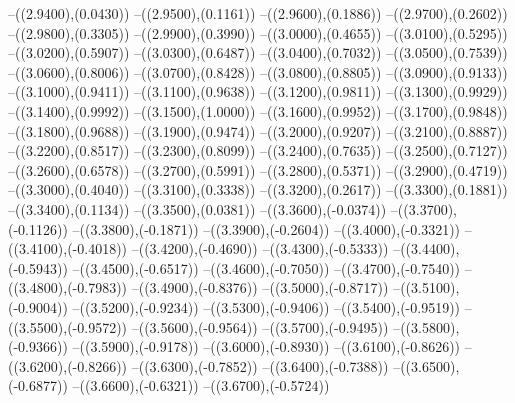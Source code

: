 {	--({\sx*(2.9400)},{\sy*(0.0430)})
	--({\sx*(2.9500)},{\sy*(0.1161)})
	--({\sx*(2.9600)},{\sy*(0.1886)})
	--({\sx*(2.9700)},{\sy*(0.2602)})
	--({\sx*(2.9800)},{\sy*(0.3305)})
	--({\sx*(2.9900)},{\sy*(0.3990)})
	--({\sx*(3.0000)},{\sy*(0.4655)})
	--({\sx*(3.0100)},{\sy*(0.5295)})
	--({\sx*(3.0200)},{\sy*(0.5907)})
	--({\sx*(3.0300)},{\sy*(0.6487)})
	--({\sx*(3.0400)},{\sy*(0.7032)})
	--({\sx*(3.0500)},{\sy*(0.7539)})
	--({\sx*(3.0600)},{\sy*(0.8006)})
	--({\sx*(3.0700)},{\sy*(0.8428)})
	--({\sx*(3.0800)},{\sy*(0.8805)})
	--({\sx*(3.0900)},{\sy*(0.9133)})
	--({\sx*(3.1000)},{\sy*(0.9411)})
	--({\sx*(3.1100)},{\sy*(0.9638)})
	--({\sx*(3.1200)},{\sy*(0.9811)})
	--({\sx*(3.1300)},{\sy*(0.9929)})
	--({\sx*(3.1400)},{\sy*(0.9992)})
	--({\sx*(3.1500)},{\sy*(1.0000)})
	--({\sx*(3.1600)},{\sy*(0.9952)})
	--({\sx*(3.1700)},{\sy*(0.9848)})
	--({\sx*(3.1800)},{\sy*(0.9688)})
	--({\sx*(3.1900)},{\sy*(0.9474)})
	--({\sx*(3.2000)},{\sy*(0.9207)})
	--({\sx*(3.2100)},{\sy*(0.8887)})
	--({\sx*(3.2200)},{\sy*(0.8517)})
	--({\sx*(3.2300)},{\sy*(0.8099)})
	--({\sx*(3.2400)},{\sy*(0.7635)})
	--({\sx*(3.2500)},{\sy*(0.7127)})
	--({\sx*(3.2600)},{\sy*(0.6578)})
	--({\sx*(3.2700)},{\sy*(0.5991)})
	--({\sx*(3.2800)},{\sy*(0.5371)})
	--({\sx*(3.2900)},{\sy*(0.4719)})
	--({\sx*(3.3000)},{\sy*(0.4040)})
	--({\sx*(3.3100)},{\sy*(0.3338)})
	--({\sx*(3.3200)},{\sy*(0.2617)})
	--({\sx*(3.3300)},{\sy*(0.1881)})
	--({\sx*(3.3400)},{\sy*(0.1134)})
	--({\sx*(3.3500)},{\sy*(0.0381)})
	--({\sx*(3.3600)},{\sy*(-0.0374)})
	--({\sx*(3.3700)},{\sy*(-0.1126)})
	--({\sx*(3.3800)},{\sy*(-0.1871)})
	--({\sx*(3.3900)},{\sy*(-0.2604)})
	--({\sx*(3.4000)},{\sy*(-0.3321)})
	--({\sx*(3.4100)},{\sy*(-0.4018)})
	--({\sx*(3.4200)},{\sy*(-0.4690)})
	--({\sx*(3.4300)},{\sy*(-0.5333)})
	--({\sx*(3.4400)},{\sy*(-0.5943)})
	--({\sx*(3.4500)},{\sy*(-0.6517)})
	--({\sx*(3.4600)},{\sy*(-0.7050)})
	--({\sx*(3.4700)},{\sy*(-0.7540)})
	--({\sx*(3.4800)},{\sy*(-0.7983)})
	--({\sx*(3.4900)},{\sy*(-0.8376)})
	--({\sx*(3.5000)},{\sy*(-0.8717)})
	--({\sx*(3.5100)},{\sy*(-0.9004)})
	--({\sx*(3.5200)},{\sy*(-0.9234)})
	--({\sx*(3.5300)},{\sy*(-0.9406)})
	--({\sx*(3.5400)},{\sy*(-0.9519)})
	--({\sx*(3.5500)},{\sy*(-0.9572)})
	--({\sx*(3.5600)},{\sy*(-0.9564)})
	--({\sx*(3.5700)},{\sy*(-0.9495)})
	--({\sx*(3.5800)},{\sy*(-0.9366)})
	--({\sx*(3.5900)},{\sy*(-0.9178)})
	--({\sx*(3.6000)},{\sy*(-0.8930)})
	--({\sx*(3.6100)},{\sy*(-0.8626)})
	--({\sx*(3.6200)},{\sy*(-0.8266)})
	--({\sx*(3.6300)},{\sy*(-0.7852)})
	--({\sx*(3.6400)},{\sy*(-0.7388)})
	--({\sx*(3.6500)},{\sy*(-0.6877)})
	--({\sx*(3.6600)},{\sy*(-0.6321)})
	--({\sx*(3.6700)},{\sy*(-0.5724)})
}
